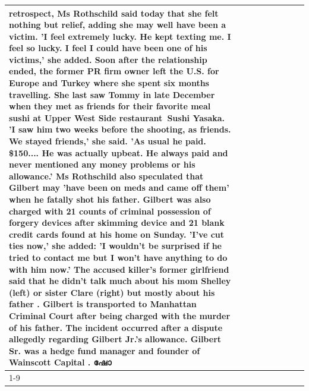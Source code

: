 \begin{table}[H]
\begin{tabular}{lllrlllll}
retrospect, Ms Rothschild said today that she felt nothing but relief, adding she may well have been a victim. 'I feel extremely lucky. He kept texting me. I feel so lucky. I feel I could have been one of his victims,' she added. Soon after the relationship ended, the former PR firm owner left the U.S. for Europe and Turkey where she spent six months  travelling. She last saw Tommy in late December when they met as friends for their favorite meal sushi at Upper West Side restaurant Sushi Yasaka. 'I saw him two weeks before the shooting, as friends. We stayed friends,' she said. 'As usual he paid. \$150.... He was actually upbeat. He always paid and never mentioned any money problems or his allowance.' Ms Rothschild also speculated that Gilbert may 'have been on meds and came off them' when he fatally shot his father. Gilbert was also charged with 21 counts of criminal possession of forgery devices after skimming device and 21 blank credit cards found at his home on Sunday. 'I've cut ties now,' she added: 'I wouldn’t be surprised if he tried to contact me but I won’t have anything to do with him now.' The accused killer's former girlfriend said that he didn't talk much about his mom Shelley (left) or sister Clare (right) but mostly about his father . Gilbert is transported to Manhattan Criminal Court  after being charged with the murder of his father. The incident occurred after a dispute allegedly regarding Gilbert Jr.'s allowance. Gilbert Sr. was a hedge fund manager and founder of Wainscott Capital . ഷോ \\
\cline{1-9}

\end{tabular}
\end{table}
